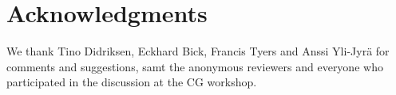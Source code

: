 \documentclass[11pt]{article}
\begin{document}
\section*{Acknowledgments}

We thank Tino Didriksen, Eckhard Bick, Francis Tyers and Anssi
Yli-Jyr{\"a} for comments and suggestions, samt the anonymous
reviewers and everyone who participated in the discussion at the CG workshop.




\end{document}
